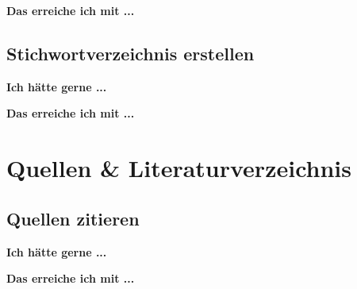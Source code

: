 \documentclass[twoside, 
               a4paper, 
               10pt, 
               parskip=full, 
               sectionentrydots=true, 
               listof=totoc, 
               listof=entryprefix,
               numbers=endperiod]{scrartcl}
\begin{document}
\newpage
{\textbf {Das erreiche ich mit ...}}
 
\begin{miniSeite}[colbacktitle=black!35!white,title=\LaTeX-Code]

\end{miniSeite}




\newpage
\subsection{Stichwortverzeichnis erstellen}
{\textbf {Ich hätte gerne ...}}
 
\begin{miniSeite}[colbacktitle=black!35!white,title=Ausdruck]

\end{miniSeite}


\newpage
{\textbf {Das erreiche ich mit ...}}
 
\begin{miniSeite}[colbacktitle=black!35!white,title=\LaTeX-Code]

\end{miniSeite}





\newpage
\section{Quellen \& Literaturverzeichnis}
\subsection{Quellen zitieren}

{\textbf {Ich hätte gerne ...}}
 



\newpage
{\textbf {Das erreiche ich mit ...}}
 
\begin{miniSeite}[colbacktitle=black!35!white,title=\LaTeX-Code]

\end{miniSeite}

\end{document}
